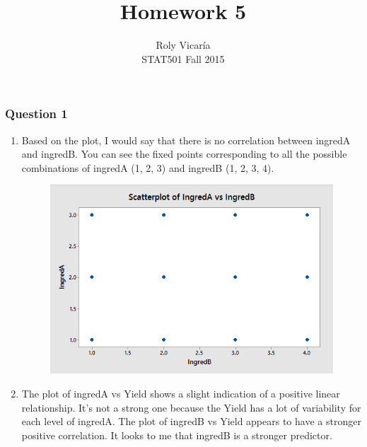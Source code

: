\documentclass{article}
\title{Homework 5}
\author{Roly Vicar\'ia \\ STAT501 Fall 2015}
\begin{document}
    
    
    \maketitle
    
    

    
    \subsubsection{Question 1}\label{question-1}

\begin{enumerate}
\def\labelenumi{\alph{enumi})}
\item
  Based on the plot, I would say that there is no correlation between
  ingredA and ingredB. You can see the fixed points corresponding to all
  the possible combinations of ingredA (1, 2, 3) and ingredB (1, 2, 3,
  4). 
  
  \begin{figure}[h!]
 \centering
 \includegraphics[scale=.5]{./images/scatterplot_ingredA-vs-ingredB.png}
\end{figure}

\item
  The plot of ingredA vs Yield shows a slight indication of a positive
  linear relationship. It's not a strong one because the Yield has a lot
  of variability for each level of ingredA. The plot of ingredB vs Yield
  appears to have a stronger positive correlation. It looks to me that
  ingredB is a stronger predictor. 
  

\end{enumerate}
\end{document}
